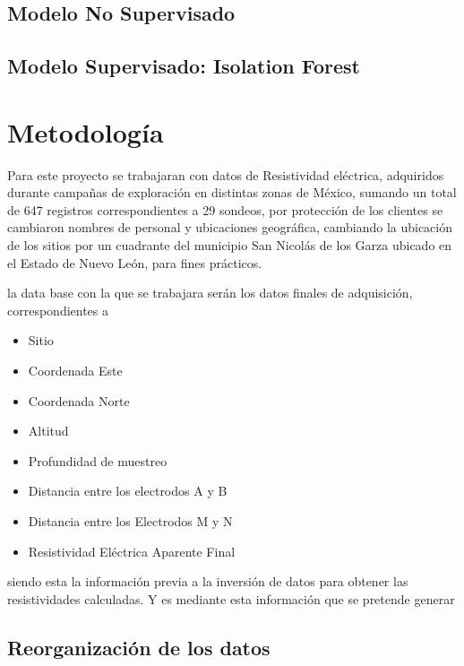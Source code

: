 \documentclass[sn-mathphys,Numbered]{sn-jnl}%
\theoremstyle{thmstyleone}%
\theoremstyle{thmstyletwo}%
\theoremstyle{thmstylethree}%
\begin{document}
\begin{lstlisting}
	
	
	
\end{lstlisting}


\subsection{Modelo No Supervisado}\label{subsec2}

\subsection{Modelo Supervisado: Isolation Forest}\label{subsec3}


\section{Metodología}\label{sec3}
Para este proyecto se trabajaran con datos de Resistividad eléctrica, adquiridos durante campañas de exploración en distintas zonas de México, sumando un total de 647 registros correspondientes a 29 sondeos, por protección de los clientes se cambiaron nombres de personal y ubicaciones geográfica, cambiando la ubicación de los sitios por un cuadrante del municipio San Nicolás de los Garza ubicado en el Estado de Nuevo León, para fines prácticos.

la data base con la que se trabajara serán los datos finales de adquisición, correspondientes a 

\begin{itemize} 
	\item  Sitio
	\item  Coordenada Este
	\item  Coordenada Norte
	\item  Altitud 
	\item  Profundidad de muestreo
	\item  Distancia entre los electrodos A y B
	\item  Distancia entre los Electrodos M y N
	\item  Resistividad Eléctrica Aparente Final
\end{itemize}
siendo esta la información previa a la inversión de datos para obtener las resistividades calculadas. Y es mediante esta información que se pretende generar 



\subsection{Reorganización de los datos}\label{subsec4}
\end{document}
